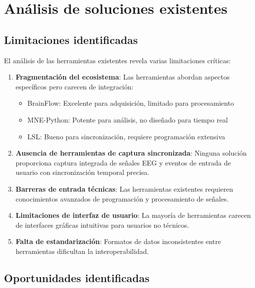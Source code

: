 \section{Análisis de soluciones existentes}
\label{sec:analisis_soluciones}

\subsection{Limitaciones identificadas}
\label{subsec:limitaciones}

El análisis de las herramientas existentes revela varias limitaciones críticas:

\begin{enumerate}
    \item \textbf{Fragmentación del ecosistema}: Las herramientas abordan aspectos específicos pero carecen de integración:
    \begin{itemize}
        \item BrainFlow: Excelente para adquisición, limitado para procesamiento
        \item MNE-Python: Potente para análisis, no diseñado para tiempo real
        \item LSL: Bueno para sincronización, requiere programación extensiva
    \end{itemize}

    \item \textbf{Ausencia de herramientas de captura sincronizada}: Ninguna solución proporciona captura integrada de señales EEG y eventos de entrada de usuario con sincronización temporal precisa.

    \item \textbf{Barreras de entrada técnicas}: Las herramientas existentes requieren conocimientos avanzados de programación y procesamiento de señales.

    \item \textbf{Limitaciones de interfaz de usuario}: La mayoría de herramientas carecen de interfaces gráficas intuitivas para usuarios no técnicos.

    \item \textbf{Falta de estandarización}: Formatos de datos inconsistentes entre herramientas dificultan la interoperabilidad.
\end{enumerate}

\subsection{Oportunidades identificadas}
\label{subsec:oportunidades}

